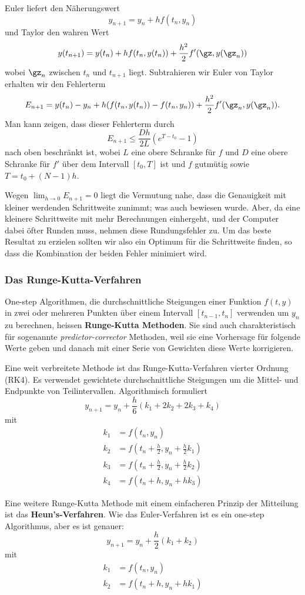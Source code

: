 \documentclass[%
11pt,%
twoside,%
titlepage,%
german,%
headsepline%
]{scrartcl}
\begin{document}
Euler liefert den N\"aherungswert
$$y_{n+1}=y_n+hf(t_n,y_n)$$
und Taylor den wahren Wert
$$y(t_{n+1})=y(t_n)+hf(t_n,y(t_n))+\frac{h^2}{2}f'(\gz,y(\gz_n))$$
wobei $\gz_n$ zwischen $t_n$ und $t_{n+1}$ liegt. Subtrahieren wir Euler von Taylor erhalten wir den Fehlerterm
$$
E_{n+1}=y(t_n)-y_n+
h(f(t_n,y(t_n))-f(t_n,y_n))+\frac{h^2}{2}f'(\gz_n,y(\gz_n)).
$$
Man kann zeigen, dass dieser Fehlerterm durch
$$E_{n+1}\leq \frac{Dh}{2L}(e^{T-t_0}-1)$$
nach oben beschr\"ankt ist, wobei $L$ eine obere Schranke f\"ur $f$ und $D$ eine obere Schranke f\"ur $f'$ \"uber dem Intervall $[t_0,T]$ ist und $f$ gutm\"utig sowie $T=t_0+(N-1)h$.

Wegen $\lim_{h\to0}E_{n+1}=0$ liegt die Vermutung nahe, dass die Genauigkeit mit kleiner werdenden Schrittweite zunimmt; was auch bewiesen wurde. Aber, da eine kleinere Schrittweite mit mehr Berechnungen einhergeht, und der Computer dabei \"ofter Runden muss, nehmen diese Rundungsfehler zu. Um das beste Resultat zu erzielen sollten wir also ein Optimum f\"ur die Schrittweite finden, so dass die Kombination der beiden Fehler minimiert wird.

\subsubsection{Das Runge-Kutta-Verfahren}

One-step Algorithmen, die durchschnittliche Steigungen einer Funktion $f(t,y)$ in zwei oder mehreren Punkten \"uber einem Intervall $[t_{n-1},t_n]$ verwenden um $y_n$ zu berechnen, heissen \textbf{Runge-Kutta Methoden}. Sie sind auch charakteristisch f\"ur sogenannte \emph{predictor-corrector} Methoden, weil sie eine Vorhersage f\"ur folgende Werte geben und danach mit einer Serie von Gewichten diese Werte korrigieren.

Eine weit verbreitete Methode ist das Runge-Kutta-Verfahren vierter Ordnung (RK4). Es verwendet gewichtete durchschnittliche Steigungen um die Mittel- und Endpunkte von Teilintervallen. Algorithmisch formuliert
$$y_{n+1}=y_n+\frac{h}{6}(k_1+2k_2+2k_3+k_4)$$
mit
\begin{align*}
k_1 &= f(t_n,y_n)\\
k_2 &= f(t_n+\frac{h}{2},y_n+\frac{h}{2}k_1)\\
k_3 &= f(t_n+\frac{h}{2},y_n+\frac{h}{2}k_2)\\
k_4 &= f(t_n+h,y_n+hk_3)
\end{align*}

Eine weitere Runge-Kutta Methode mit einem einfacheren Prinzip der Mitteilung ist das \textbf{Heun's-Verfahren}. Wie das Euler-Verfahren ist es ein one-step Algorithmus, aber es ist genauer:
$$y_{n+1}=y_n+\frac{h}{2}(k_1+k_2)$$
mit
\begin{align*}
k_1 &= f(t_n,y_n)\\
k_2 &= f(t_n+h,y_n+hk_1)
\end{align*}
\end{document}
